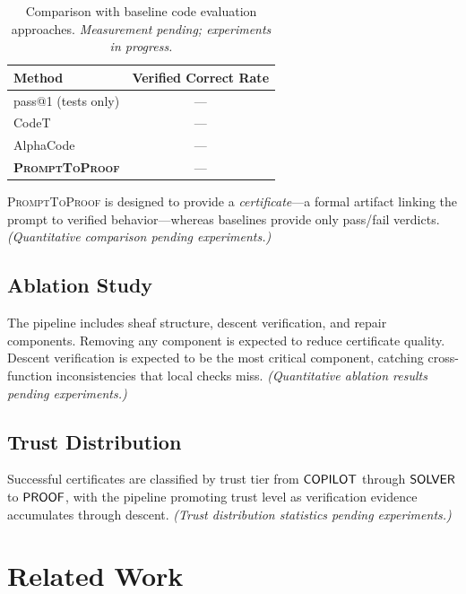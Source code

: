 \documentclass[11pt]{article}
\newcommand{\PromptToProof}{\textsc{PromptToProof}}
\begin{document}
\begin{table}[t]
\centering
\caption{Comparison with baseline code evaluation approaches.
  \emph{Measurement pending; experiments in progress.}}\label{tab:baselines}
\begin{tabular}{lc}
\toprule
\textbf{Method} & \textbf{Verified Correct Rate} \\
\midrule
pass@1 (tests only) & --- \\
CodeT              & --- \\
AlphaCode          & --- \\
\textbf{\PromptToProof} & --- \\
\bottomrule
\end{tabular}
\end{table}

\PromptToProof{} is designed to provide a \emph{certificate}---a formal
artifact linking the prompt to verified behavior---whereas baselines
provide only pass/fail verdicts.
\emph{(Quantitative comparison pending experiments.)}

\subsection{Ablation Study}

The pipeline includes sheaf structure, descent verification, and repair components.
Removing any component is expected to reduce certificate quality.
Descent verification is expected to be the most critical component,
catching cross-function inconsistencies that local checks miss.
\emph{(Quantitative ablation results pending experiments.)}

\subsection{Trust Distribution}

Successful certificates are classified by trust tier from
$\mathsf{COPILOT}$ through $\mathsf{SOLVER}$ to $\mathsf{PROOF}$, with the pipeline promoting
trust level as verification evidence accumulates through descent.
\emph{(Trust distribution statistics pending experiments.)}

\section{Related Work}\label{sec:related}
\end{document}
